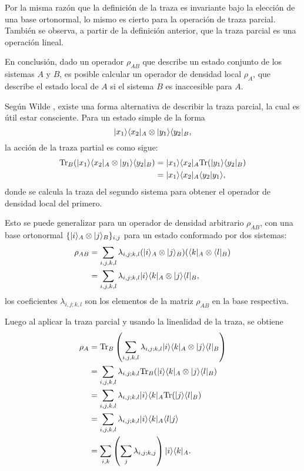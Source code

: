 Por la misma razón que la definición de la traza es invariante bajo la elección
de una base ortonormal, lo mismo es cierto para la operación de traza parcial.
También se observa, a partir de la definición anterior, que la traza parcial es
una operación lineal.

En conclusión, dado un operador $\rho_{AB}$ que describe un estado conjunto de
los sistemas $A$ y $B$, es posible calcular un operador de densidad local
$\rho_A$, que describe el estado local de $A$ si el sistema $B$ es inaccesible
para $A$.


Según Wilde {\cite{wilde2011classical}}, existe una forma alternativa de
describir la traza parcial, la cual es útil estar consciente. Para un estado
simple de la forma  
\begin{equation}
	|x_1\rangle \langle x_2|_A\otimes|y_1\rangle \langle y_2|_B,
\end{equation} 
la acción de la traza partial es como sigue: 
\begin{equation}
	\begin{split}
	{\rm Tr}_B(	|x_1\rangle \langle x_2|_A\otimes|y_1\rangle \langle y_2|_B)&=|x_1\rangle \langle x_2|_A{\rm Tr}(|y_1\rangle \langle y_2|_B)\\
	&=|x_1\rangle \langle x_2|_A \langle y_2|y_1\rangle,
	\end{split}
\end{equation}
donde se calcula la traza del segundo sistema para obtener el operador de
densidad local del primero.

Esto se puede generalizar para un operador de densidad arbitrario $\rho_{AB}$,
con una base ortonormal $\{|i \rangle_A \otimes |j\rangle_B \} _{i,j}$ para un estado
conformado por dos sistemas:
\begin{equation}
	\begin{split}
	\rho_{AB}&=\sum_{i,j,k,l}\lambda_{i,j;k,l}(|i\rangle_A \otimes|j\rangle_B)(\langle k|_A\otimes \langle l|_B)\\
	&=\sum_{i,j,k,l}\lambda_{i,j;k,l} |i\rangle \langle k|_A\otimes|j\rangle \langle l|_B,
	\end{split}
\end{equation}
los coeficientes $\lambda_{i,j;k,l}$  son los elementos de la matriz $\rho_{AB}$ en la base respectiva.


Luego al aplicar la traza parcial y usando la linealidad de la traza, se obtiene 
\begin{equation}
	\begin{split}
		\rho_A&={\rm Tr}_B\left(\sum_{i,j,k,l}\lambda_{i,j;k,l} |i\rangle \langle k|_A\otimes|j\rangle \langle l|_B\right)\\
		&=\sum_{i,j,k,l}\lambda_{i,j;k,l} {\rm Tr}_B(|i\rangle \langle k|_A\otimes|j\rangle \langle l|_B)\\
		&=\sum_{i,j,k,l}\lambda_{i,j;k,l}|i\rangle \langle k|_A {\rm Tr}(|j\rangle \langle l|_B)\\
		&=\sum_{i,j,k,l}\lambda_{i,j;k,l}|i\rangle \langle k|_A \langle l|j\rangle \\
		&=\sum_{i,k}\left(\sum_j\lambda_{i,j;k,j}\right)|i\rangle \langle k|_A.
	\end{split}
\end{equation}

